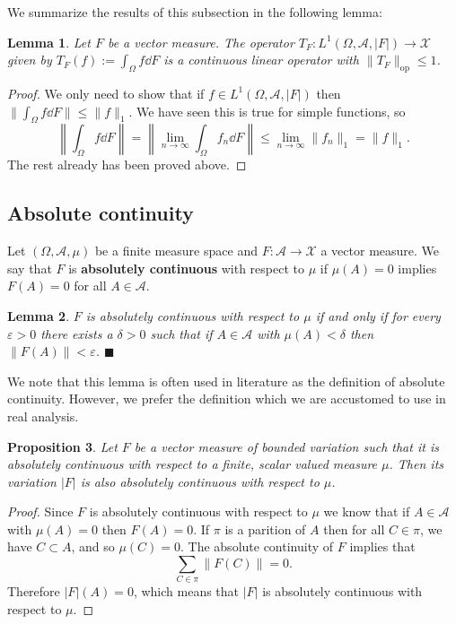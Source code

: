 \documentclass[a4paper, 12pt]{article}
\newtheorem{lem}{Lemma}[section]
\newtheorem{state}[lem]{Proposition}
\newcommand*{\qedb}{\hfill\ensuremath{\blacksquare}}
\begin{document}
We summarize the results of this subsection in the following lemma:
\begin{lem}\label{lem:vector-measure-integration-bounded-op} Let $F$ be a vector measure. The operator $T_F\colon L^1(\Omega, \mathcal{A}, |F|) \to \mathcal{X}$ given by $T_F(f) := \int_{\Omega} f \dd{F}$ is a continuous linear operator with $\|T_F \|_{\mathrm{op}} \leqslant 1$.
\end{lem}
\begin{proof} We only need to show that if $f \in L^1(\Omega, \mathcal{A}, |F|)$ then $\| \int_{\Omega} f \dd{F} \| \leqslant \| f \|_1$. We have seen this is true for simple functions, so
$$\left \| \int_{\Omega} f \dd{F} \right \| = \left \| \lim_{n \to \infty} \int_{\Omega} f_n \dd{F} \right \| \leqslant \lim_{n \to \infty}\| f_n \|_1 = \|f\|_1.$$
The rest already has been proved above.
\end{proof}
\subsection{Absolute continuity}\label{subsec:absolute-continuity}

Let $(\Omega, \mathcal{A}, \mu)$ be a finite measure space and $F \colon \mathcal{A} \to \mathcal{X}$ a vector measure. We say that $F$ is \textbf{absolutely continuous} with respect to $\mu$ if $\mu(A) = 0$ implies $F(A)=0$ for all $A \in \mathcal{A}$.

\begin{lem}\label{lem:vector-measure-absolutely-continous} $F$ is absolutely continuous with respect to $\mu$ if and only if for every $\varepsilon > 0$ there exists a $\delta > 0$ such that if $A \in \mathcal{A}$ with $\mu(A) < \delta$ then $\| F(A) \| < \varepsilon$. \qedb
\end{lem}

We note that this lemma is often used in literature as the definition of absolute continuity. However, we prefer the definition which we are accustomed to use in real analysis.

\begin{state} Let $F$ be a vector measure of bounded variation such that it is absolutely continuous with respect to a finite, scalar valued measure $\mu$. Then its variation $|F|$ is also absolutely continuous with respect to $\mu$.
\end{state}
\begin{proof} Since $F$ is absolutely continuous with respect to $\mu$ we know that if $A \in \mathcal{A}$ with $\mu(A)=0$ then $F(A) = 0$.
If $\pi$ is a parition of $A$ then for all $C \in \pi$, we have $C \subset A$, and so $\mu(C)=0$. The absolute continuity of $F$ implies that
$$\sum_{C \in \pi} \| F(C) \| = 0.$$
Therefore $|F|(A) = 0$, which means that $|F|$ is absolutely continuous with respect to $\mu$.
\end{proof}
\end{document}
